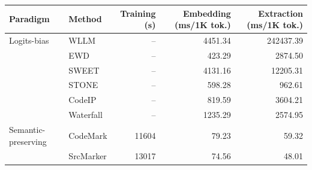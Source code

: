 \begin{tabular}{llrrr}
\toprule
Paradigm & Method & Training (s) & Embedding (ms/1K tok.) & Extraction (ms/1K tok.) \\
\midrule
Logits-bias & WLLM & -- & 4451.34 & 242437.39 \\
 & EWD & -- & 423.29 & 2874.50 \\
 & SWEET & -- & 4131.16 & 12205.31 \\
 & STONE & -- & 598.28 & 962.61 \\
 & CodeIP & -- & 819.59 & 3604.21 \\
 & Waterfall & -- & 1235.29 & 2574.95 \\
Semantic-preserving & CodeMark & 11604 & 79.23 & 59.32 \\
 & SrcMarker & 13017 & 74.56 & 48.01 \\
\bottomrule
\end{tabular}
